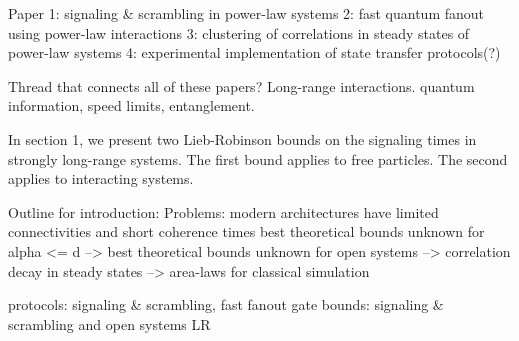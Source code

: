 Paper 1: signaling & scrambling in power-law systems
2: fast quantum fanout using power-law interactions
3: clustering of correlations in steady states of power-law systems
4: experimental implementation of state transfer protocols(?)

Thread that connects all of these papers? Long-range interactions. quantum information, speed limits, entanglement.

In section 1, we present two Lieb-Robinson bounds on the signaling times in strongly long-range systems. The first bound applies to free particles. The second applies to interacting systems.

Outline for introduction:
Problems: modern architectures have limited connectivities and short coherence times
best theoretical bounds unknown for alpha <= d -->
best theoretical bounds unknown for open systems --> correlation decay in steady states --> area-laws for classical simulation

protocols: signaling & scrambling, fast fanout gate
bounds: signaling & scrambling and open systems LR
